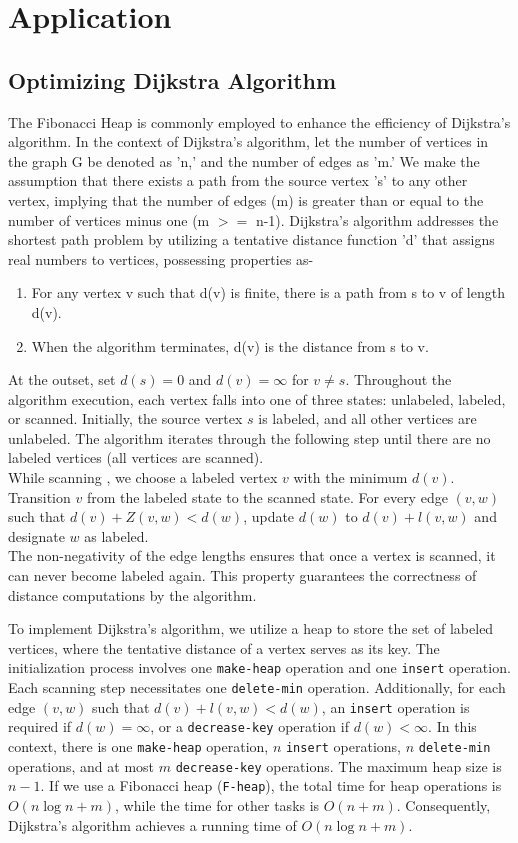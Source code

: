 \documentclass[12pt, a4paper]{article}
\begin{document}
 \section{Application}
\subsection{Optimizing Dijkstra Algorithm}
The Fibonacci Heap is commonly employed to enhance the efficiency of Dijkstra's algorithm. In the context of Dijkstra's algorithm, let the number of vertices in the graph G be denoted as 'n,' and the number of edges as 'm.' We make the assumption that there exists a path from the source vertex 's' to any other vertex, implying that the number of edges (m) is greater than or equal to the number of vertices minus one (m $>=$ n-1). Dijkstra's algorithm addresses the shortest path problem by utilizing a tentative distance function 'd' that assigns real numbers to vertices, possessing properties as-
\begin{enumerate}
	\item  For any vertex v such that d(v) is finite, there is a path from s to v of length d(v).
	\item When the algorithm terminates, d(v) is the distance from s to v.
\end{enumerate}
At the outset, set $d(s) = 0$ and $d(v) = \infty$ for $v \neq s$. Throughout the algorithm execution, each vertex falls into one of three states: unlabeled, labeled, or scanned. Initially, the source vertex $s$ is labeled, and all other vertices are unlabeled. The algorithm iterates through the following step until there are no labeled vertices (all vertices are scanned).\\
While scanning , we choose a labeled vertex $v$ with the minimum $d(v)$. Transition $v$ from the labeled state to the scanned state. For every edge $(v, w)$ such that $d(v) + Z(v,w) < d(w)$, update $d(w)$ to $d(v) + l(v, w)$ and designate $w$ as labeled.\\
The non-negativity of the edge lengths ensures that once a vertex is scanned, it can never become labeled again. This property guarantees the correctness of distance computations by the algorithm.\cite{dijkstra}

To implement Dijkstra’s algorithm, we utilize a heap to store the set of labeled vertices, where the tentative distance of a vertex serves as its key. The initialization process involves one \texttt{make-heap} operation and one \texttt{insert} operation. Each scanning step necessitates one \texttt{delete-min} operation. Additionally, for each edge $(v, w)$ such that $d(v) + l(v, w) < d(w)$, an \texttt{insert} operation is required if $d(w) = \infty$, or a \texttt{decrease-key} operation if $d(w) < \infty$. In this context, there is one \texttt{make-heap} operation, $n$ \texttt{insert} operations, $n$ \texttt{delete-min} operations, and at most $m$ \texttt{decrease-key} operations. The maximum heap size is $n - 1$. If we use a Fibonacci heap (\texttt{F-heap}), the total time for heap operations is $O(n \log n + m)$, while the time for other tasks is $O(n + m)$. Consequently, Dijkstra’s algorithm achieves a running time of $O(n \log n + m)$.\cite{fredman1987fibonacci}
\end{document}
